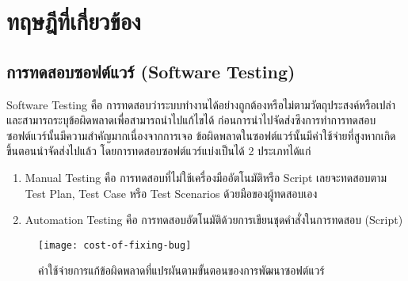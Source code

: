 \section{ทฤษฎีที่เกี่ยวข้อง}
    \subsection{การทดสอบซอฟต์แวร์ (Software Testing)}
        Software Testing คือ การทดสอบว่าระบบทำงานได้อย่างถูกต้องหรือไม่ตามวัตถุประสงค์หรือเปล่าและสามารถระบุข้อผิดพลาดเพื่อสามารถนำไปแก้ไขได้
        ก่อนการนำไปจัดส่งซึงการทำการทดสอบซอฟต์แวร์นั้นมีความสำคัญมากเนื่องจากการเจอ ข้อผิดพลาดในซอฟต์แวร์นั้นมีค่าใช้จ่ายที่สูงหากเกิดขึ้นตอนนำจัดส่งไปแล้ว
        โดยการทดสอบซอฟต์แวร์แบ่งเป็นได้ 2 ประเภทได้แก่
        \begin{enumerate}
            \item Manual Testing คือ การทดสอบที่ไม่ใช้เครื่องมืออัตโนมัติหรือ Script เลยจะทดสอบตาม Test Plan, Test Case หรือ Test Scenarios ด้วยมือของผู้ทดสอบเอง
            \item Automation Testing คือ การทดสอบอัตโนมัติด้วยการเขียนชุดคำสั่งในการทดสอบ (Script)
        \end{enumerate}
        \begin{figure}[H]
            \centering
            \texttt{[image: cost-of-fixing-bug]}
            \caption{ค่าใช้จ่ายการแก้ข้อผิดพลาดที่แปรผันตามขั้นตอนของการพัฒนาซอฟต์แวร์}\label{cost-of-fixing-bug}
        \end{figure}

